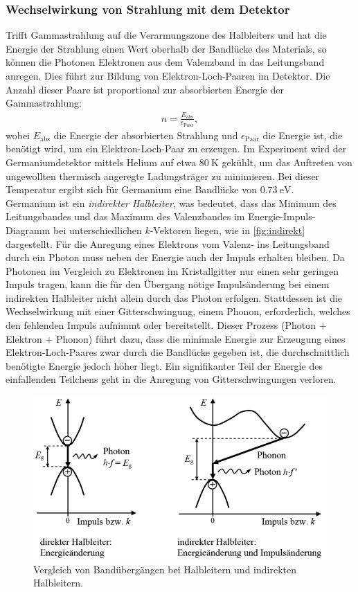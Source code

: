 \subsubsection{Wechselwirkung von Strahlung mit dem Detektor}
Trifft Gammastrahlung auf die Verarmungszone des Halbleiters und hat die Energie der Strahlung einen Wert oberhalb der Bandlücke des Materials, so können die Photonen Elektronen aus dem Valenzband in das Leitungsband anregen. Dies führt zur Bildung von Elektron-Loch-Paaren im Detektor. Die Anzahl dieser Paare ist proportional zur absorbierten Energie der Gammastrahlung:
\begin{align}
  n = \frac{E_{\text{abs}}}{\epsilon_\text{Paar}},
\end{align}
wobei $E_{\text{abs}}$ die Energie der absorbierten Strahlung und $\epsilon_\text{Paar}$ die Energie ist, die benötigt wird, um ein Elektron-Loch-Paar zu erzeugen.
Im Experiment wird der Germaniumdetektor mittels Helium auf etwa $\SI{80}{\kelvin}$ gekühlt, um das Auftreten von ungewollten thermisch angeregte Ladungsträger zu minimieren. Bei dieser Temperatur ergibt sich für Germanium eine Bandlücke von $\SI{0.73}{\eV}$\cite{Sze2007}.
\\Germanium ist ein \textit{indirekter Halbleiter}, was bedeutet, dass das Minimum des Leitungsbandes und das Maximum des Valenzbandes im Energie-Impuls-Diagramm bei unterschiedlichen \(k\)-Vektoren liegen, wie in \autoref{fig:indirekt} dargestellt. 
Für die Anregung eines Elektrons vom Valenz- ins Leitungsband durch ein Photon muss neben der Energie auch der Impuls erhalten bleiben. Da Photonen im Vergleich zu Elektronen im Kristallgitter nur einen sehr geringen Impuls tragen, kann die für den Übergang nötige Impulsänderung bei einem indirekten Halbleiter nicht allein durch das Photon erfolgen. 
Stattdessen ist die Wechselwirkung mit einer Gitterschwingung, einem Phonon, erforderlich, welches den fehlenden Impuls aufnimmt oder bereitstellt. Dieser Prozess (Photon + Elektron + Phonon) führt dazu, dass die minimale Energie zur Erzeugung eines Elektron-Loch-Paares zwar durch die Bandlücke gegeben ist, die durchschnittlich benötigte Energie jedoch höher liegt. Ein signifikanter Teil der Energie des einfallenden Teilchens geht in die Anregung von Gitterschwingungen verloren.
\begin{figure}[H]
  \centering
  \includegraphics[scale=0.7]{Ressourcen/indirekt.png}
  \caption{Vergleich von Bandübergängen bei Halbleitern und indirekten Halbleitern.}
  \label{fig:indirekt}
\end{figure}
